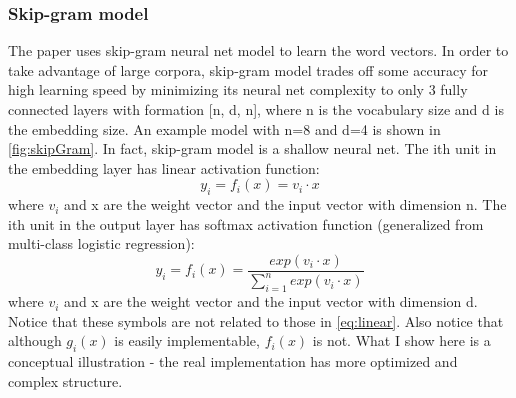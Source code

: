 \documentclass{article}
\begin{document}
\subsubsection{Skip-gram model}
The paper uses skip-gram neural net model to learn the word vectors. In order to take advantage of large corpora, skip-gram model trades off some accuracy for high learning speed by minimizing its neural net complexity to only 3 fully connected layers with formation [n, d, n], where n is the vocabulary size and d is the embedding size. An example model with n=8 and d=4 is shown in \autoref{fig:skipGram}. In fact, skip-gram model is a shallow neural net. The ith unit in the embedding layer has linear activation function:
\begin{equation}
	y_i = f_i(x) = v_i \cdot x
	\label{eq:linear}
\end{equation}
where $ v_i $ and x are the weight vector and the input vector with dimension n. The ith unit in the output layer has softmax activation function (generalized from multi-class logistic regression):
\begin{equation}
	y_i = f_i(x) = \frac{exp(v_i \cdot x)}{\sum_{i = 1}^{n}exp(v_i \cdot x)}
\end{equation}
where $ v_i $ and x are the weight vector and the input vector with dimension d. Notice that these symbols are not related to those in \autoref{eq:linear}. Also notice that although $ g_i(x) $ is easily implementable, $ f_i(x) $ is not. What I show here is a conceptual illustration - the real implementation has more optimized and complex structure.
\end{document}
